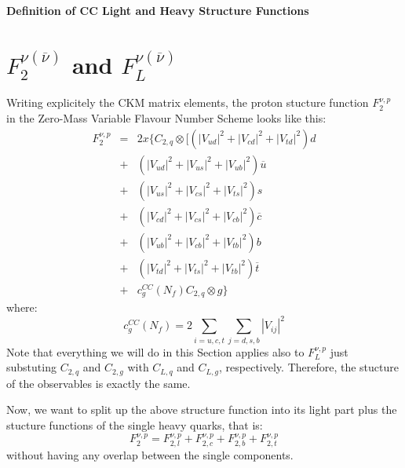 \documentclass[10pt,a4paper]{article}
\begin{document}
\begin{center}
\textbf{\Large Definition of CC Light and Heavy Structure Functions}
\end{center}
\tableofcontents
\newpage

\section{$F_2^{\nu(\overline{\nu})}$ and $F_L^{\nu(\overline{\nu})}$}
Writing explicitely the CKM matrix elements, the proton stucture
function $F_2^{\nu,p}$ in the Zero-Mass Variable Flavour Number Scheme
looks like this:
\begin{equation}\label{f2nup}
\begin{array}{rcl}
F_2^{\nu,p} &=& 2x\Big\{ C_{2,q}\otimes\Big[\left(|V_{ud}|^2+|V_{cd}|^2+|V_{td}|^2\right)d\\
            &+& \left(|V_{ud}|^2+|V_{us}|^2+|V_{ub}|^2\right)\overline{u}\\
            &+& \left(|V_{us}|^2+|V_{cs}|^2+|V_{ts}|^2\right)s\\
            &+& \left(|V_{cd}|^2+|V_{cs}|^2+|V_{cb}|^2\right)\overline{c}\\
            &+& \left(|V_{ub}|^2+|V_{cb}|^2+|V_{tb}|^2\right)b\\
            &+& \left(|V_{td}|^2+|V_{ts}|^2+|V_{tb}|^2\right)\overline{t}\\
            &+& c^{CC}_g(N_f)C_{2,q}\otimes g\Big\}
\end{array}
\end{equation}
where:
\begin{equation}
c^{CC}_g(N_f) = 2\sum_{i=u,c,t}\sum_{j=d,s,b}|V_{ij}|^2
\end{equation}
Note that everything we will do in this Section applies also to
$F_L^{\nu,p}$ just substuting $C_{2,q}$ and $C_{2,g}$ with $C_{L,q}$
and $C_{L,g}$, respectively. Therefore, the stucture of the
observables is exactly the same.

Now, we want to split up the above structure function into its light
part plus the stucture functions of the single heavy quarks, that is:
\begin{equation}
F_2^{\nu,p} = F_{2,l}^{\nu,p} + F_{2,c}^{\nu,p} + F_{2,b}^{\nu,p} + F_{2,t}^{\nu,p}
\end{equation}
without having any overlap between the single components.
\end{document}

